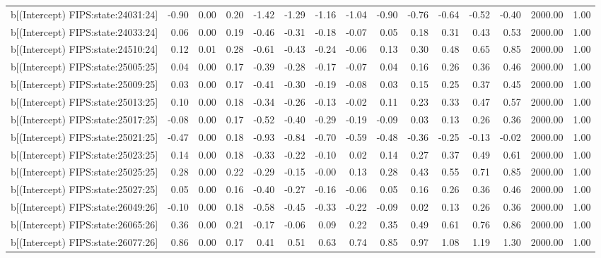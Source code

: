 \begin{table}[ht]
\begin{tabular}{rrrrrrrrrrrrrrr}
  b[(Intercept) FIPS:state:24031:24] & -0.90 & 0.00 & 0.20 & -1.42 & -1.29 & -1.16 & -1.04 & -0.90 & -0.76 & -0.64 & -0.52 & -0.40 & 2000.00 & 1.00 \\ 
  b[(Intercept) FIPS:state:24033:24] & 0.06 & 0.00 & 0.19 & -0.46 & -0.31 & -0.18 & -0.07 & 0.05 & 0.18 & 0.31 & 0.43 & 0.53 & 2000.00 & 1.00 \\ 
  b[(Intercept) FIPS:state:24510:24] & 0.12 & 0.01 & 0.28 & -0.61 & -0.43 & -0.24 & -0.06 & 0.13 & 0.30 & 0.48 & 0.65 & 0.85 & 2000.00 & 1.00 \\ 
  b[(Intercept) FIPS:state:25005:25] & 0.04 & 0.00 & 0.17 & -0.39 & -0.28 & -0.17 & -0.07 & 0.04 & 0.16 & 0.26 & 0.36 & 0.46 & 2000.00 & 1.00 \\ 
  b[(Intercept) FIPS:state:25009:25] & 0.03 & 0.00 & 0.17 & -0.41 & -0.30 & -0.19 & -0.08 & 0.03 & 0.15 & 0.25 & 0.37 & 0.45 & 2000.00 & 1.00 \\ 
  b[(Intercept) FIPS:state:25013:25] & 0.10 & 0.00 & 0.18 & -0.34 & -0.26 & -0.13 & -0.02 & 0.11 & 0.23 & 0.33 & 0.47 & 0.57 & 2000.00 & 1.00 \\ 
  b[(Intercept) FIPS:state:25017:25] & -0.08 & 0.00 & 0.17 & -0.52 & -0.40 & -0.29 & -0.19 & -0.09 & 0.03 & 0.13 & 0.26 & 0.36 & 2000.00 & 1.00 \\ 
  b[(Intercept) FIPS:state:25021:25] & -0.47 & 0.00 & 0.18 & -0.93 & -0.84 & -0.70 & -0.59 & -0.48 & -0.36 & -0.25 & -0.13 & -0.02 & 2000.00 & 1.00 \\ 
  b[(Intercept) FIPS:state:25023:25] & 0.14 & 0.00 & 0.18 & -0.33 & -0.22 & -0.10 & 0.02 & 0.14 & 0.27 & 0.37 & 0.49 & 0.61 & 2000.00 & 1.00 \\ 
  b[(Intercept) FIPS:state:25025:25] & 0.28 & 0.00 & 0.22 & -0.29 & -0.15 & -0.00 & 0.13 & 0.28 & 0.43 & 0.55 & 0.71 & 0.85 & 2000.00 & 1.00 \\ 
  b[(Intercept) FIPS:state:25027:25] & 0.05 & 0.00 & 0.16 & -0.40 & -0.27 & -0.16 & -0.06 & 0.05 & 0.16 & 0.26 & 0.36 & 0.46 & 2000.00 & 1.00 \\ 
  b[(Intercept) FIPS:state:26049:26] & -0.10 & 0.00 & 0.18 & -0.58 & -0.45 & -0.33 & -0.22 & -0.09 & 0.02 & 0.13 & 0.26 & 0.36 & 2000.00 & 1.00 \\ 
  b[(Intercept) FIPS:state:26065:26] & 0.36 & 0.00 & 0.21 & -0.17 & -0.06 & 0.09 & 0.22 & 0.35 & 0.49 & 0.61 & 0.76 & 0.86 & 2000.00 & 1.00 \\ 
  b[(Intercept) FIPS:state:26077:26] & 0.86 & 0.00 & 0.17 & 0.41 & 0.51 & 0.63 & 0.74 & 0.85 & 0.97 & 1.08 & 1.19 & 1.30 & 2000.00 & 1.00 \\ 

\end{tabular}
\end{table}
